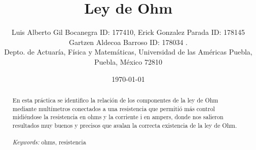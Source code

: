 \documentclass{article}
\begin{document}

\renewcommand{\footrulewidth}{1pt}
\renewcommand{\tablename}{Tabla}
\renewcommand{\figurename}{Figura}


\title{Ley de Ohm}
\author{\small{Luis Alberto Gil Bocanegra ID: 177410, Erick Gonzalez Parada ID: 178145}\\
 \small{Gartzen Aldecoa Barroso ID: 178034 .}\\		%
	   \small{Depto. de Actuaría, Física y Matemáticas, Universidad de las Américas Puebla, Puebla, M\'exico 72810}}
\date{\small{\today}}

\maketitle


\begin{abstract}
    En esta práctica se identifico la relación de los componentes de la ley de Ohm mediante multímetros 
    conectados a una resistencia que permitió más control midiéndose la resistencia en ohms y la corriente i en ampers, donde nos salieron 
    resultados muy buenos y precisos que avalan la correcta existencia de la ley de Ohm.
\\
\\
{\it Keywords:}  ohms, resistencia 
\\
\\
\end{abstract}
\end{document}

